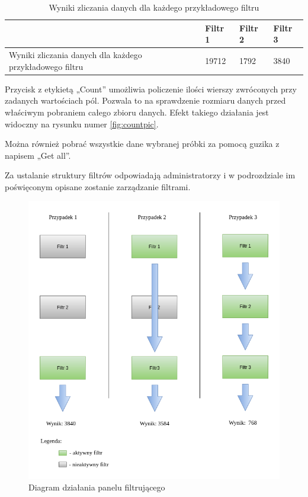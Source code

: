 \documentclass[a4paper,12pt,twoside]{article}
\begin{document}
\begin{center}
\begin{table} [H]
\begin{tabular}{| p{4cm }| p{2.7cm} | p{2.7cm} | p{2.7cm}|}
\hline
& Filtr 1 & Filtr 2 & Filtr 3\\
\hline
Wyniki zliczania danych dla każdego przykładowego filtru & 19712 & 1792 & 3840\\ \hline
\end{tabular}

\caption{Wyniki zliczania danych dla każdego przykładowego filtru}
\label{table:filterDiagramTable}
\end{table}
\end{center}

Przycisk z etykietą „Count” umożliwia policzenie ilości wierszy zwróconych przy zadanych wartościach pól. Pozwala to na sprawdzenie rozmiaru danych przed właściwym pobraniem całego zbioru danych. Efekt takiego działania jest widoczny na rysunku
numer \ref{fig:countpic}.

Można również pobrać wszystkie dane wybranej próbki za pomocą guzika z napisem „Get all”.

Za ustalanie struktury filtrów odpowiadają administratorzy i w podrozdziale im poświęconym
opisane zostanie zarządzanie filtrami.

\setlength{\footskip}{0pt}
\begin{figure}
\includegraphics[width=1\linewidth]{obrazy/aplikacja/filterDiagram.png}
\caption{Diagram działania panelu filtrującego}
\label{fig:filterDiagrampic}
\end{figure}
\restoregeometry
\end{document}
